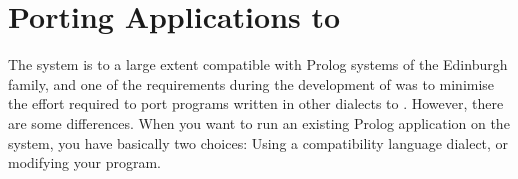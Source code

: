 %
%
%
%
%
%
%

\chapter{Porting Applications to {\eclipse}}
\label{chapporting}

The {\eclipse} system is to a large extent compatible with Prolog systems
of the Edinburgh family, and one of the requirements during the development
of {\eclipse} was to minimise the effort required to port
programs written in other dialects to {\eclipse}.
However, there are some differences.
When you want to run an existing Prolog application on the {\eclipse} system,
you have basically two choices:
Using a compatibility language dialect, or modifying your program.

